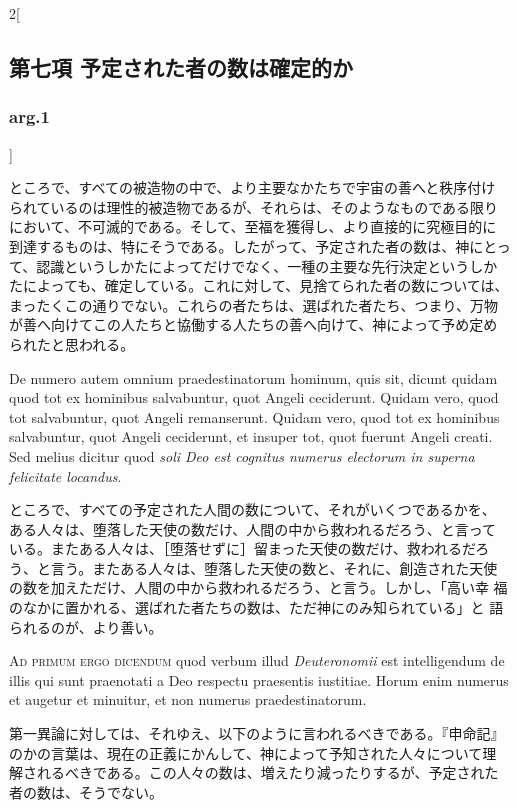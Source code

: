 \documentclass[paper=a4paper,fontsize=10pt,jafontsize=9pt,titlepage]{jlreq}
\begin{document}
\begin{paracol}{2}[\subsection{第七項 予定された者の数は確定的か}\subsubsection{arg.1}]
\switchcolumn


ところで、すべての被造物の中で、より主要なかたちで宇宙の善へと秩序付け
られているのは理性的被造物であるが、それらは、そのようなものである限り
において、不可滅的である。そして、至福を獲得し、より直接的に究極目的に
到達するものは、特にそうである。したがって、予定された者の数は、神にとっ
て、認識というしかたによってだけでなく、一種の主要な先行決定というしか
たによっても、確定している。これに対して、見捨てられた者の数については、
まったくこの通りでない。これらの者たちは、選ばれた者たち、つまり、万物
が善へ向けてこの人たちと協働する人たちの善へ向けて、神によって予め定め
られたと思われる。


\switchcolumn*


De numero autem omnium
praedestinatorum hominum, quis sit, dicunt quidam quod tot ex hominibus
salvabuntur, quot Angeli ceciderunt. Quidam vero, quod tot salvabuntur,
quot Angeli remanserunt. Quidam vero, quod tot ex hominibus salvabuntur,
quot Angeli ceciderunt, et insuper tot, quot fuerunt Angeli creati. Sed
melius dicitur quod {\itshape soli Deo est cognitus numerus electorum in superna
felicitate locandus}.


\switchcolumn


ところで、すべての予定された人間の数について、それがいくつであるかを、
ある人々は、堕落した天使の数だけ、人間の中から救われるだろう、と言って
いる。またある人々は、［堕落せずに］留まった天使の数だけ、救われるだろ
う、と言う。またある人々は、堕落した天使の数と、それに、創造された天使
の数を加えただけ、人間の中から救われるだろう、と言う。しかし、「高い幸
福のなかに置かれる、選ばれた者たちの数は、ただ神にのみ知られている」と
語られるのが、より善い。


\switchcolumn*[\subsubsection{ad.1}]


{\scshape Ad primum ergo dicendum} quod verbum illud
{\itshape Deuteronomii} est intelligendum de illis qui sunt praenotati a Deo
respectu praesentis iustitiae. Horum enim numerus et augetur et
minuitur, et non numerus praedestinatorum.


\switchcolumn


第一異論に対しては、それゆえ、以下のように言われるべきである。『申命記』
のかの言葉は、現在の正義にかんして、神によって予知された人々について理
解されるべきである。この人々の数は、増えたり減ったりするが、予定された
者の数は、そうでない。



\end{paracol}
\end{document}
